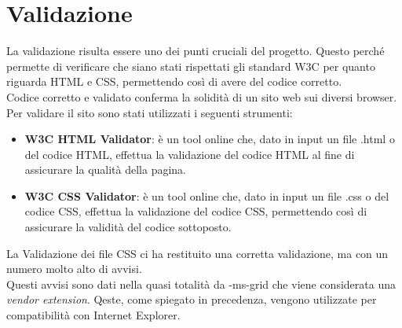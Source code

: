 \section{Validazione}
La validazione risulta essere uno dei punti cruciali del progetto. Questo perché permette di verificare che siano stati rispettati gli standard W3C per quanto riguarda HTML e CSS, permettendo così di avere del codice corretto.\\
Codice corretto e validato conferma la solidità di un sito web sui diversi browser. \\
Per validare il sito sono stati utilizzati i seguenti strumenti:
\begin{itemize}
	\item \textbf{W3C HTML Validator}: è un tool online che, dato in input un file .html o del codice HTML, effettua la validazione del codice HTML al fine di assicurare la qualità della pagina.
	\item \textbf{W3C CSS Validator}: è un tool online che, dato in input un file .css o del codice CSS, effettua la validazione del codice CSS, permettendo così di assicurare la validità del codice sottoposto.
\end{itemize}

La Validazione dei file CSS ci ha restituito una corretta validazione, ma con un numero molto alto di avvisi. \\
Questi avvisi sono dati nella quasi totalità da -ms-grid che viene considerata una \textit{vendor extension}. Qeste, come spiegato in precedenza, vengono utilizzate per compatibilità con Internet Explorer.